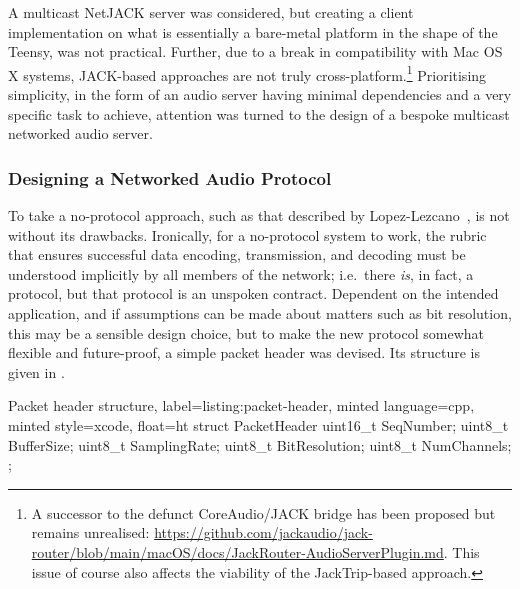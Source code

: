 
A multicast NetJACK server was considered, but creating a client implementation
on what is essentially a bare-metal platform in the shape of the Teensy, was not
practical.
Further, due to a break in compatibility with Mac OS X systems, JACK-based
approaches are not truly cross-platform.\footnote{
    A successor to the defunct CoreAudio/JACK bridge has been proposed but
    remains unrealised:
    \url{https://github.com/jackaudio/jack-router/blob/main/macOS/docs/JackRouter-AudioServerPlugin.md}.
    This issue of course also affects the viability of the JackTrip-based
    approach.
}
Prioritising simplicity, in the form of an audio server having minimal
dependencies and a very specific task to achieve, attention was turned to the
design of a bespoke multicast networked audio server.

\subsubsection{Designing a Networked Audio Protocol}\label{subsubsec:designing-a-protocol}




To take a no-protocol approach, such as that described by
Lopez-Lezcano~\citep{lopez-lezcano_jack_2012}, is not without its drawbacks.
Ironically, for a no-protocol system to
work, the rubric that ensures successful data encoding, transmission, and
decoding must be understood implicitly by all members of the network; i.e.\
there \textit{is}, in fact, a protocol, but that protocol is an unspoken
contract.
Dependent on the intended application, and if assumptions can be made about
matters such as bit resolution, this may be a sensible design choice, but to
make the new protocol somewhat flexible and future-proof, a simple packet
header was devised.
Its structure is given in .

\begin{codelisting}{
    Packet header structure,
    label=listing:packet-header,
    minted language=cpp,
    minted style=xcode,
    float=ht
}
    struct PacketHeader {
        uint16_t SeqNumber;
        uint8_t BufferSize;
        uint8_t SamplingRate;
        uint8_t BitResolution;
        uint8_t NumChannels;
    };
\end{codelisting}

